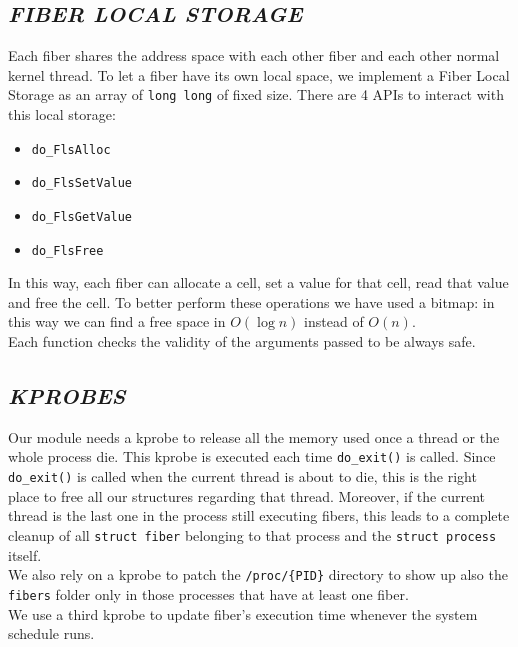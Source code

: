 \documentclass[a4paper]{article}
\begin{document}
\subsection*{\textit{FIBER LOCAL STORAGE}}
Each fiber shares the address space with each other fiber and each other normal kernel thread. To let a fiber have its own local space, we implement a Fiber Local Storage as an array of \texttt{long long} of fixed size. There are 4 APIs to interact with this local storage:

\begin{itemize}
  \item \texttt{do\_FlsAlloc}
  \item \texttt{do\_FlsSetValue}
  \item \texttt{do\_FlsGetValue}
  \item \texttt{do\_FlsFree}
\end{itemize}\bigskip
In this way, each fiber can allocate a cell, set a value for that cell, read that value and free the cell.
To better perform these operations we have used a bitmap: in this way we can find a free space in $O(\log n)$ instead of $O(n)$.\bigskip\\
Each function checks the validity of the arguments passed to be always safe.

\subsection*{\textit{KPROBES}}
Our module needs a kprobe to release all the memory used once a thread or the whole process die. This kprobe is executed each time \texttt{do\_exit()} is called. Since \texttt{do\_exit()} is called when the current thread is about to die, this is the right place to free all our structures regarding that thread. Moreover, if the current thread is the last one in the process still executing fibers, this leads to a complete cleanup of all \texttt{struct fiber} belonging to that process and the \texttt{struct process} itself.\bigskip\\
We also rely on a kprobe to patch the \texttt{/proc/\{PID\}} directory to show up also the \texttt{fibers} folder only in those processes that have at least one fiber.\bigskip\\
We use a third kprobe to update fiber's execution time whenever the system schedule runs.
\end{document}
